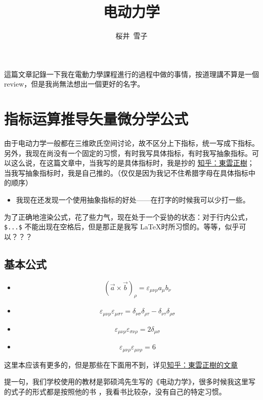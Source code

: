 \documentclass{article}
\title{电动力学}
\author{桜井\ 雪子}
\date{}
\begin{document}
\maketitle

這篇文章記錄一下我在電動力學課程進行的過程中做的事情，按道理講不算是一個 review，但是我尚無法想出一個更好的名字。

\section{指标运算推导矢量微分学公式}

由于电动力学一般都在三维欧氏空间讨论，故不区分上下指标，统一写成下指标。另外，我现在尚没有一个固定的习惯，有时我写具体指标，有时我写抽象指标。可以这么说，在这篇文章中，当我写的是具体指标时，我是抄的 \href{https://www.zhihu.com/people/Masaki.Ryuu}{知乎：東雲正樹}；当我写抽象指标时，我是自己推的。（仅仅是因为我记不住希腊字母在具体指标中的顺序）

\begin{itemize}
    \item 我现在还发现一个使用抽象指标的好处——在打字的时候我可以少打一些。
\end{itemize}

为了正确地渲染公式，花了些力气，现在处于一个妥协的状态：对于行内公式，\texttt{\$...\$} 不能出现在空格后，但是那正是我写 \LaTeX 时所习惯的。等等，似乎可以？？？

\subsection{基本公式}

\begin{itemize}
    \item $$(\vec{a}\times\vec{b})_{\rho}=\varepsilon_{\mu\nu\rho}a_{\mu}b_{\nu}$$
    \item $$\varepsilon_{\mu\nu\rho}\varepsilon_{\mu\sigma\tau}=\delta_{\nu\sigma}\delta_{\rho\tau}-\delta_{\nu\tau}\delta_{\rho\sigma}$$
    \item $$\varepsilon_{\mu\nu\rho}\varepsilon_{\sigma\nu\rho}=2\delta_{\mu\sigma}$$
    \item $$\varepsilon_{\mu\nu\rho}\varepsilon_{\mu\nu\rho}=6$$
\end{itemize}

这里本应该有更多的，但是那些在下面用不到，详见\href{https://zhuanlan.zhihu.com/p/331738362}{知乎：東雲正樹的文章}

提一句，我们学校使用的教材是郭硕鸿先生写的《电动力学》，很多时候我这里写的式子的形式都是按照他的书 ，我看书比较杂，没有自己的特定习惯。
\end{document}
